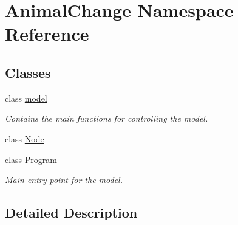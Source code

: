 \hypertarget{namespace_animal_change}{}\section{Animal\+Change Namespace Reference}
\label{namespace_animal_change}
\subsection*{Classes}
\begin{DoxyCompactItemize}
\item 
class \mbox{\hyperlink{class_animal_change_1_1model}{model}}
\begin{DoxyCompactList}\small\item\em Contains the main functions for controlling the model. \end{DoxyCompactList}\item 
class \mbox{\hyperlink{class_animal_change_1_1_node}{Node}}
\item 
class \mbox{\hyperlink{class_animal_change_1_1_program}{Program}}
\begin{DoxyCompactList}\small\item\em Main entry point for the model. \end{DoxyCompactList}\end{DoxyCompactItemize}


\subsection{Detailed Description}
